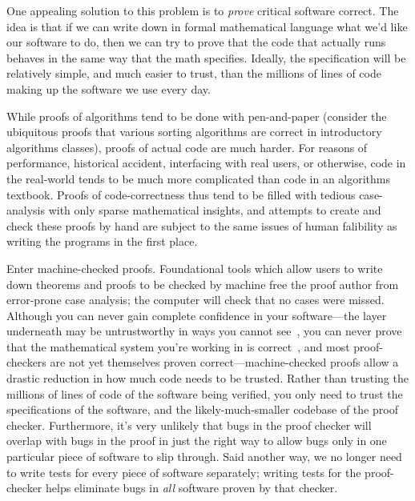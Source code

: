 One appealing solution to this problem is to \emph{prove} critical software correct.
The idea is that if we can write down in formal mathematical language what we'd like our software to do, then we can try to prove that the code that actually runs behaves in the same way that the math specifies.
Ideally, the specification will be relatively simple, and much easier to trust, than the millions of lines of code making up the software we use every day.

While proofs of algorithms tend to be done with pen-and-paper (consider the ubiquitous proofs that various sorting algorithms are correct in introductory algorithms classes), proofs of actual code are much harder.
For reasons of performance, historical accident, interfacing with real users, or otherwise, code in the real-world tends to be much more complicated than code in an algorithms textbook.
Proofs of code-correctness thus tend to be filled with tedious case-analysis with only sparse mathematical insights, and attempts to create and check these proofs by hand are subject to the same issues of human falibility as writing the programs in the first place.

Enter machine-checked proofs.
Foundational tools which allow users to write down theorems and proofs to be checked by machine free the proof author from error-prone case analysis; the computer will check that no cases were missed.
Although you can never gain complete confidence in your software---the layer underneath may be untrustworthy in ways you cannot see~\cite{Reflections1984Thompson}, you can never prove that the mathematical system you're working in is correct~\cite{sep-goedel-incompleteness}, and most proof-checkers are not yet themselves proven correct---machine-checked proofs allow a drastic reduction in how much code needs to be trusted.
Rather than trusting the millions of lines of code of the software being verified, you only need to trust the specifications of the software, and the likely-much-smaller codebase of the proof checker.
Furthermore, it's very unlikely that bugs in the proof checker will overlap with bugs in the proof in just the right way to allow bugs only in one particular piece of software to slip through.
Said another way, we no longer need to write tests for every piece of software separately; writing tests for the proof-checker helps eliminate bugs in \emph{all} software proven by that checker.

